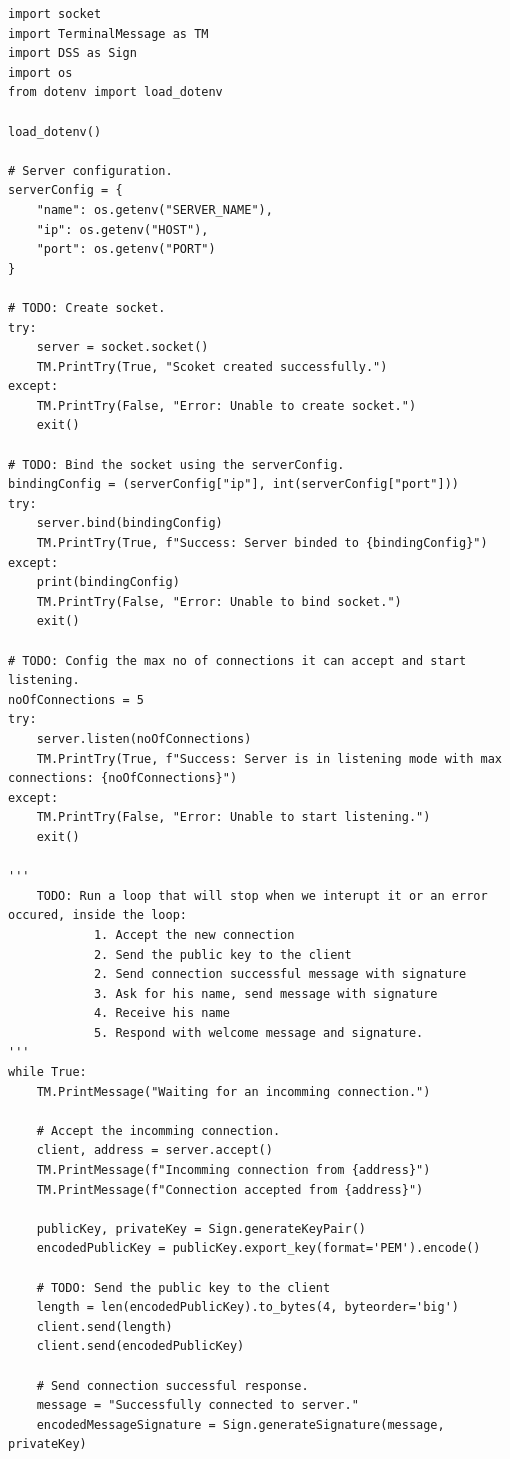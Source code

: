 \begin{lstlisting}[style=mypython, caption={server.py}, label={code:A-2-b-server}]
import socket
import TerminalMessage as TM
import DSS as Sign
import os
from dotenv import load_dotenv

load_dotenv()

# Server configuration.
serverConfig = {
    "name": os.getenv("SERVER_NAME"),
    "ip": os.getenv("HOST"),
    "port": os.getenv("PORT")
}

# TODO: Create socket.
try:
    server = socket.socket()
    TM.PrintTry(True, "Scoket created successfully.")
except:
    TM.PrintTry(False, "Error: Unable to create socket.")
    exit()

# TODO: Bind the socket using the serverConfig.
bindingConfig = (serverConfig["ip"], int(serverConfig["port"]))
try:
    server.bind(bindingConfig)
    TM.PrintTry(True, f"Success: Server binded to {bindingConfig}")
except:
    print(bindingConfig)
    TM.PrintTry(False, "Error: Unable to bind socket.")
    exit()

# TODO: Config the max no of connections it can accept and start listening.
noOfConnections = 5
try:
    server.listen(noOfConnections)
    TM.PrintTry(True, f"Success: Server is in listening mode with max connections: {noOfConnections}")
except:
    TM.PrintTry(False, "Error: Unable to start listening.")
    exit()

'''
    TODO: Run a loop that will stop when we interupt it or an error occured, inside the loop:
            1. Accept the new connection
            2. Send the public key to the client
            2. Send connection successful message with signature
            3. Ask for his name, send message with signature
            4. Receive his name
            5. Respond with welcome message and signature.
'''
while True:
    TM.PrintMessage("Waiting for an incomming connection.")

    # Accept the incomming connection.
    client, address = server.accept()
    TM.PrintMessage(f"Incomming connection from {address}")
    TM.PrintMessage(f"Connection accepted from {address}")

    publicKey, privateKey = Sign.generateKeyPair()
    encodedPublicKey = publicKey.export_key(format='PEM').encode()

    # TODO: Send the public key to the client
    length = len(encodedPublicKey).to_bytes(4, byteorder='big')
    client.send(length)
    client.send(encodedPublicKey)

    # Send connection successful response.
    message = "Successfully connected to server."
    encodedMessageSignature = Sign.generateSignature(message, privateKey)


\end{lstlisting}
